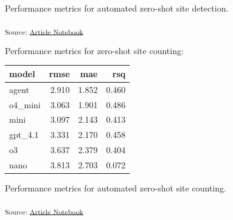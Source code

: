 \documentclass[
  letterpaper,
  DIV=11,
  numbers=noendperiod]{scrartcl}
\begin{document}
Performance metrics for automated zero-shot site detection.

\textsubscript{Source:
\href{https://nick-gauthier.github.io/itenez-forest-gardens/index-preview.html}{Article
Notebook}}

Performance metrics for zero-shot site counting:

\begin{longtable}[]{@{}lrrr@{}}
\toprule\noalign{}
model & rmse & mae & rsq \\
\midrule\noalign{}
\endhead
\bottomrule\noalign{}
\endlastfoot
agent & 2.910 & 1.852 & 0.460 \\
o4\_mini & 3.063 & 1.901 & 0.486 \\
mini & 3.097 & 2.143 & 0.413 \\
gpt\_4.1 & 3.331 & 2.170 & 0.458 \\
o3 & 3.637 & 2.379 & 0.404 \\
nano & 3.813 & 2.703 & 0.072 \\
\end{longtable}

Performance metrics for automated zero-shot site counting.

\textsubscript{Source:
\href{https://nick-gauthier.github.io/itenez-forest-gardens/index-preview.html}{Article
Notebook}}
\end{document}
